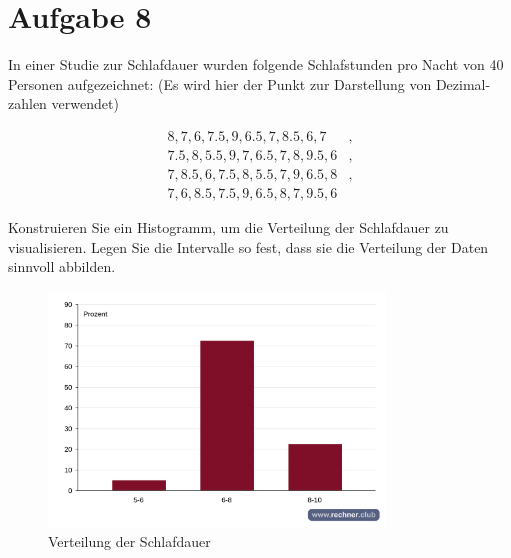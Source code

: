 \section{Aufgabe 8}
\setcounter{section}{8}

In einer Studie zur Schlafdauer wurden folgende Schlafstunden pro Nacht von 40
Personen aufgezeichnet: (Es wird hier der Punkt zur Darstellung von Dezimal-
zahlen verwendet)

\begin{align*}
       8, 7, 6, 7.5, 9, 6.5, 7, 8.5, 6, 7&,\\
     7.5, 8, 5.5, 9, 7, 6.5, 7, 8, 9.5, 6&,\\
     7, 8.5, 6, 7.5, 8, 5.5, 7, 9, 6.5, 8&,\\
     7, 6, 8.5, 7.5, 9, 6.5, 8, 7, 9.5, 6&
\end{align*}

Konstruieren Sie ein Histogramm, um die Verteilung der Schlafdauer zu
visualisieren. Legen Sie die Intervalle so fest, dass sie die Verteilung der
Daten sinnvoll abbilden.

\begin{figure}[h]
    \centering
    \includegraphics[width=0.8\textwidth]{./assets/abbildung-08-01.png}
    \caption{Verteilung der Schlafdauer}
\end{figure}
